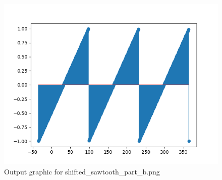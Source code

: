 \documentclass[10pt,a4paper, margin=1in]{article}
\begin{document}
\begin{enumerate}
\begin{enumerate}
                    \begin{figure}[H]
                        \centering
                        \includegraphics[scale=0.75]{shifted_sawtooth_part_b.png}
                        \caption{Output graphic for shifted\_sawtooth\_part\_b.png}
                    \end{figure}
          \end{enumerate}

\end{enumerate}
\end{document}
